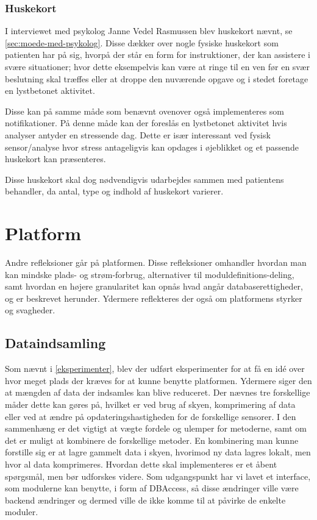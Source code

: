 \subsubsection{Huskekort}
I interviewet med psykolog Janne Vedel Rasmussen blev huskekort nævnt, se \cref{sec:moede-med-psykolog}.
Disse dækker over nogle fysiske huskekort som patienten har på sig, hvorpå der står en form for instruktioner, der kan assistere i svære situationer; hvor dette eksempelvis kan være at ringe til en ven før en svær beslutning skal træffes eller at droppe den nuværende opgave og i stedet foretage en lystbetonet aktivitet.

Disse kan på samme måde som benævnt ovenover også implementeres som notifikationer.
På denne måde kan der foreslås en lystbetonet aktivitet hvis analyser antyder en stressende dag.
Dette er især interessant ved fysisk sensor/analyse hvor stress antageligvis kan opdages i øjeblikket og et passende huskekort kan præsenteres.

Disse huskekort skal dog nødvendigvis udarbejdes sammen med patientens behandler, da antal, type og indhold af huskekort varierer.

\section{Platform}
Andre refleksioner går på platformen.
Disse refleksioner omhandler hvordan man kan mindske plads- og strøm-forbrug, alternativer til moduldefinitions-deling, samt hvordan en højere granularitet kan opnås hvad angår databaserettigheder, og er beskrevet herunder.
Ydermere reflekteres der også om platformens styrker og svagheder.

\subsection{Dataindsamling}
Som nævnt i \cref{eksperimenter}, blev der udført eksperimenter for at få en idé over hvor meget plads der kræves for at kunne benytte platformen.
Ydermere siger den at mængden af data der indsamles kan blive reduceret.
Der nævnes tre forskellige måder dette kan gøres på, hvilket er ved brug af skyen, komprimering af data eller ved at ændre på opdateringshastigheden for de forskellige sensorer.
I den sammenhæng er det vigtigt at vægte fordele og ulemper for metoderne, samt om det er muligt at kombinere de forskellige metoder.
En kombinering man kunne forstille sig er at lagre gammelt data i skyen, hvorimod ny data lagres lokalt, men hvor al data komprimeres.
Hvordan dette skal implementeres er et åbent spørgsmål, men bør udforskes videre.
Som udgangspunkt har vi lavet et interface, som modulerne kan benytte, i form af DBAccess, så disse ændringer ville være backend ændringer og dermed ville de ikke komme til at påvirke de enkelte moduler.


